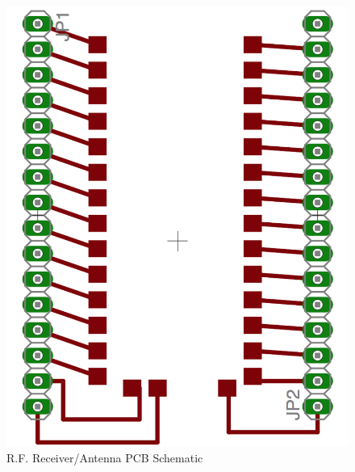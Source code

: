 \documentclass[letterpaper,10pt]{article}
\begin{document}
\begin{spacing}{1.15}
\begin{figure} [H]
	\centering
	\includegraphics[scale=0.4]{kh3-receiver-breakout.png}
	\caption{R.F. Receiver/Antenna PCB Schematic\label{fig:receiver-breakout}}
\end{figure}


\end{spacing}
\end{document}
